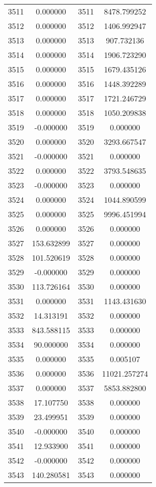 \documentclass[12pt]{article}
\begin{document}
\begin{longtable}{@{}cccc@{}}
3511 & 0.000000 & 3511 & 8478.799252 \\
3512 & 0.000000 & 3512 & 1406.992947 \\
3513 & 0.000000 & 3513 & 907.732136 \\
3514 & 0.000000 & 3514 & 1906.723290 \\
3515 & 0.000000 & 3515 & 1679.435126 \\
3516 & 0.000000 & 3516 & 1448.392289 \\
3517 & 0.000000 & 3517 & 1721.246729 \\
3518 & 0.000000 & 3518 & 1050.209838 \\
3519 & -0.000000 & 3519 & 0.000000 \\
3520 & 0.000000 & 3520 & 3293.667547 \\
3521 & -0.000000 & 3521 & 0.000000 \\
3522 & 0.000000 & 3522 & 3793.548635 \\
3523 & -0.000000 & 3523 & 0.000000 \\
3524 & 0.000000 & 3524 & 1044.890599 \\
3525 & 0.000000 & 3525 & 9996.451994 \\
3526 & 0.000000 & 3526 & 0.000000 \\
3527 & 153.632899 & 3527 & 0.000000 \\
3528 & 101.520619 & 3528 & 0.000000 \\
3529 & -0.000000 & 3529 & 0.000000 \\
3530 & 113.726164 & 3530 & 0.000000 \\
3531 & 0.000000 & 3531 & 1143.431630 \\
3532 & 14.313191 & 3532 & 0.000000 \\
3533 & 843.588115 & 3533 & 0.000000 \\
3534 & 90.000000 & 3534 & 0.000000 \\
3535 & 0.000000 & 3535 & 0.005107 \\
3536 & 0.000000 & 3536 & 11021.257274 \\
3537 & 0.000000 & 3537 & 5853.882800 \\
3538 & 17.107750 & 3538 & 0.000000 \\
3539 & 23.499951 & 3539 & 0.000000 \\
3540 & -0.000000 & 3540 & 0.000000 \\
3541 & 12.933900 & 3541 & 0.000000 \\
3542 & -0.000000 & 3542 & 0.000000 \\
3543 & 140.280581 & 3543 & 0.000000 \\

\end{longtable}
\end{document}
